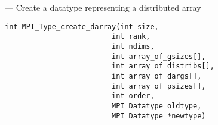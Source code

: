 \startmanpage
{}
--- Create a datatype representing a distributed array 
\startvb\begin{verbatim}
int MPI_Type_create_darray(int size,
                         int rank,
                         int ndims,
                         int array_of_gsizes[],
                         int array_of_distribs[],
                         int array_of_dargs[],
                         int array_of_psizes[],
                         int order,
                         MPI_Datatype oldtype,
                         MPI_Datatype *newtype)

\end{verbatim}
\endvb

